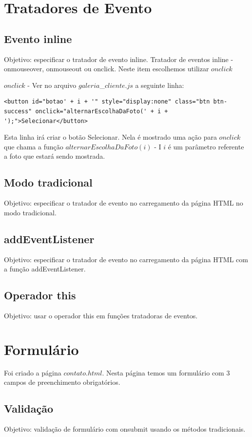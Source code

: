   
\section{Tratadores de Evento}
\subsection{Evento inline}
Objetivo: especificar o tratador de evento inline. Tratador de eventos inline - onmouseover, onmouseout ou onclick. Neste item escolhemos utilizar $onclick$

$onclick$ - Ver no arquivo $galeria$\_$cliente.js$ a seguinte linha:

\begin{lstlisting}
<button id="botao' + i + '" style="display:none" class="btn btn-success" onclick="alternarEscolhaDaFoto(' + i + ');">Selecionar</button>
\end{lstlisting}

	Esta linha irá criar o botão Selecionar. Nela é mostrado uma ação para $onclick$ que chama a função $alternarEscolhaDaFoto(i)$ - I $i$ é um parâmetro referente a foto que estará sendo mostrada.

\subsection{Modo tradicional}
Objetivo: especificar o tratador de evento no carregamento da página HTML no modo tradicional.


\subsection{addEventListener}
 Objetivo: especificar o tratador de evento no carregamento da página HTML com a função addEventListener.
 
\subsection{Operador this}
 Objetivo: usar o operador this em funções tratadoras de eventos.
 
 


\section{Formulário}
	Foi criado a página $contato.html$. Nesta página temos um formulário com $3$ campos de preenchimento obrigatórios.
	
\subsection{Validação}
	Objetivo: validação de formulário com onsubmit usando os métodos tradicionais.
	
